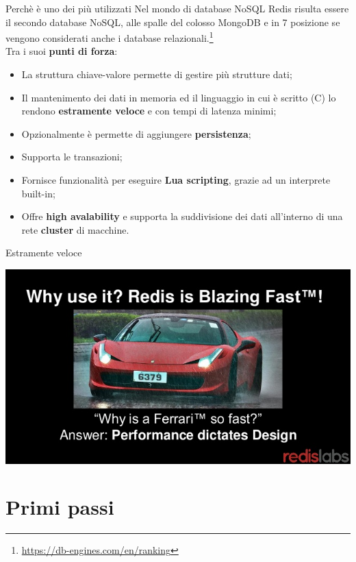 \documentclass[xcolor=dvipsnames]{beamer}
\begin{document}
      \begin{frame}{Perchè è uno dei più utilizzati}
        Nel mondo di database NoSQL Redis risulta essere il secondo database NoSQL, alle spalle del colosso
        MongoDB e in 7 posizione se vengono considerati anche i database relazionali.\footnote{\url{https://db-engines.com/en/ranking}} \\
        Tra i suoi \textbf{punti di forza}:
        \begin{itemize}
          \item La struttura chiave-valore permette di gestire più strutture dati;
          \item Il mantenimento dei dati in memoria ed il linguaggio in cui è scritto (C) lo rendono \textbf{estramente veloce}
                e con tempi di latenza minimi;
          \item Opzionalmente è permette di aggiungere \textbf{persistenza};
          \item Supporta le transazioni;
          \item Fornisce funzionalità per eseguire \textbf{Lua scripting}, grazie ad un interprete built-in;
          \item Offre \textbf{high avalability} e supporta la suddivisione dei dati all'interno di una rete \textbf{cluster} di macchine.
        \end{itemize}

      \end{frame}

      \begin{frame}{Estramente veloce}
        \begin{center}
        \includegraphics[height=6.cm]{res/redisFerrari.jpg}
        \end{center}
      \end{frame}


  \section{Primi passi}
      \begin{frame}
        \begin{block}{\centering \huge \insertsectionhead}
        \end{block}
      \end{frame}
\end{document}
